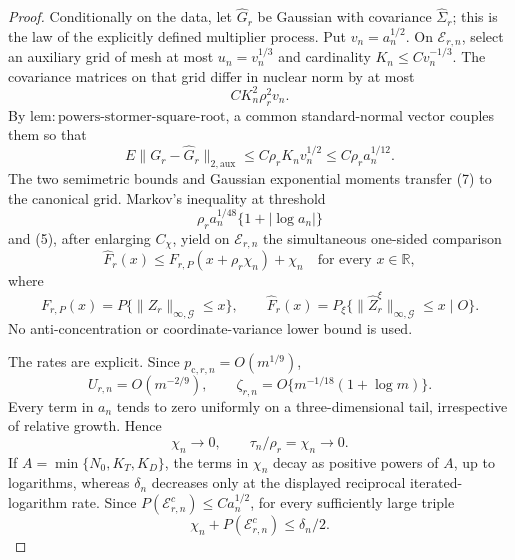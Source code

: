 \documentclass{article}
\begin{document}
\begin{proof}
Conditionally on the data, let \(\widehat G_r\) be Gaussian with covariance \(\widehat\Sigma_r\); this is the law of the explicitly defined multiplier process.  Put \(v_n=a_n^{1/2}\).  On \(\mathcal E_{r,n}\), select an auxiliary grid of mesh at most \(u_n=v_n^{1/3}\) and cardinality \(K_n\le Cv_n^{-1/3}\).  The covariance matrices on that grid differ in nuclear norm by at most
\[
 CK_n^2\rho_r^2v_n.                                     \tag{6}
\]
By \(\mathrm{lem:powers\mbox{-}stormer\mbox{-}square\mbox{-}root}\), a common standard-normal vector couples them so that
\[
 E\|G_r-\widehat G_r\|_{2,\mathrm{aux}}
 \le C\rho_rK_nv_n^{1/2}\le C\rho_ra_n^{1/12}.         \tag{7}
\]
The two semimetric bounds and Gaussian exponential moments transfer (7) to the canonical grid.  Markov's inequality at threshold
\[
 \rho_ra_n^{1/48}\{1+|\log a_n|\}                     \tag{8}
\]
and (5), after enlarging \(C_\chi\), yield on \(\mathcal E_{r,n}\) the simultaneous one-sided comparison
\[
 \widehat F_r(x)
 \le F_{r,P}(x+\rho_r\chi_n)+\chi_n
 \quad\text{for every }x\in\mathbb R,                  \tag{9}
\]
where
\[
 F_{r,P}(x)=P\{\|Z_r\|_{\infty,\mathcal G}\le x\},
 \qquad
 \widehat F_r(x)=P_\xi\{\|\widehat Z_r^\xi\|_{\infty,\mathcal G}\le x\mid O\}.
\]
No anti-concentration or coordinate-variance lower bound is used.

The rates are explicit.  Since \(p_{\mathrm c,r,n}=O(m^{1/9})\),
\[
 U_{r,n}=O(m^{-2/9}),
 \qquad \zeta_{r,n}=O\{m^{-1/18}(1+\log m)\}.           \tag{10}
\]
Every term in \(a_n\) tends to zero uniformly on a three-dimensional tail, irrespective of relative growth.  Hence
\[
 \chi_n\longrightarrow0,
 \qquad \tau_n/\rho_r=\chi_n\longrightarrow0.          \tag{11}
\]
If \(A=\min\{N_0,K_T,K_D\}\), the terms in \(\chi_n\) decay as positive powers of \(A\), up to logarithms, whereas \(\delta_n\) decreases only at the displayed reciprocal iterated-logarithm rate.  Since \(P(\mathcal E_{r,n}^c)\le Ca_n^{1/2}\), for every sufficiently large triple
\[
 \chi_n+P(\mathcal E_{r,n}^c)\le\delta_n/2.             \tag{12}
\]


\end{proof}
\end{document}
